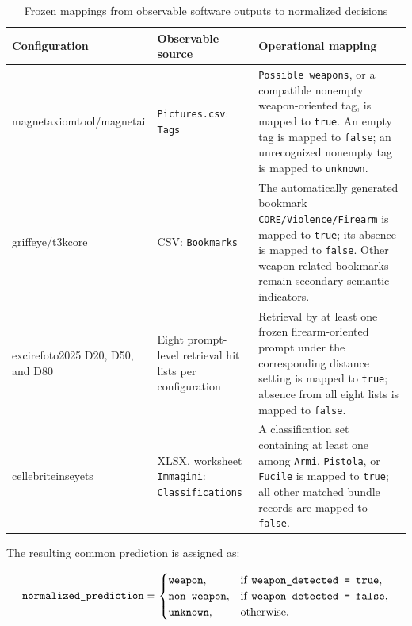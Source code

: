 \begin{table}[H]
\centering
\scriptsize
\renewcommand{\arraystretch}{1.18}
\setlength{\tabcolsep}{4pt}
\caption{Frozen mappings from observable software outputs to normalized decisions}
\label{tab:implementation-normalization-mappings}
\begin{tabularx}{\textwidth}{@{}p{} p{} X@{}}
\toprule
\textbf{Configuration} &
\textbf{Observable source} &
\textbf{Operational mapping} \\
\midrule

\gls{magnetaxiomtool}/\gls{magnetai}
&
\texttt{Pictures.csv}: \texttt{Tags}
&
\texttt{Possible weapons}, or a compatible nonempty weapon-oriented tag, is
mapped to \texttt{true}. An empty tag is mapped to \texttt{false}; an
unrecognized nonempty tag is mapped to \texttt{unknown}. \\

\gls{griffeye}/\gls{t3kcore}
&
CSV: \texttt{Bookmarks}
&
The automatically generated bookmark
\texttt{CORE/Violence/Firearm} is mapped to \texttt{true}; its absence is
mapped to \texttt{false}. Other weapon-related bookmarks remain secondary
semantic indicators. \\

\gls{excirefoto2025} D20, D50, and D80
&
Eight prompt-level retrieval hit lists per configuration
&
Retrieval by at least one frozen firearm-oriented prompt under the corresponding
distance setting is mapped to \texttt{true}; absence from all eight lists is
mapped to \texttt{false}. \\


\gls{cellebriteinseyets}
&
XLSX, worksheet \texttt{Immagini}: \texttt{Classifications}
&
A classification set containing at least one among \texttt{Armi},
\texttt{Pistola}, or \texttt{Fucile} is mapped to \texttt{true}; all other
matched bundle records are mapped to \texttt{false}. \\

\bottomrule
\end{tabularx}
\end{table}

The resulting common prediction is assigned as:

\[
\texttt{normalized\_prediction}
=
\begin{cases}
\texttt{weapon},
&
\text{if \texttt{weapon\_detected = true}},
\\
\texttt{non\_weapon},
&
\text{if \texttt{weapon\_detected = false}},
\\
\texttt{unknown},
&
\text{otherwise}.
\end{cases}
\]

